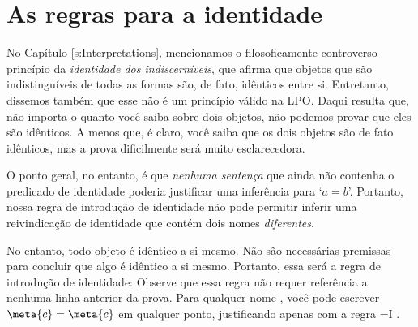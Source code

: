 
\chapter{As regras para a identidade}
No Capítulo  \ref{s:Interpretations}, mencionamos o filosoficamente controverso   princípio da \emph{identidade dos indiscerníveis}, que afirma que objetos que são indistinguíveis de todas as formas são, de fato, idênticos entre si. Entretanto, dissemos também que esse não é um princípio válido na LPO.  Daqui resulta que, não importa o quanto você saiba sobre dois objetos, não podemos provar que eles são idênticos. A menos que, é claro, você saiba que os dois objetos são de fato idênticos, mas a prova dificilmente será muito esclarecedora.

 O ponto geral, no entanto, é que \emph{nenhuma sentença} que ainda não contenha o predicado de identidade poderia justificar uma inferência para `$a=b$'. Portanto, nossa regra de introdução de identidade não pode permitir inferir uma reivindicação de identidade que contém dois nomes  \emph{diferentes}.

No entanto, todo objeto é idêntico a si mesmo. Não são necessárias premissas para concluir que algo é idêntico a si mesmo. Portanto, essa será a regra de introdução de identidade:
Observe que essa regra não requer referência a nenhuma linha anterior da prova. Para qualquer nome , você pode escrever $\meta{c}=\meta{c}$ em qualquer ponto, justificando apenas com a regra  {=}I .
 
